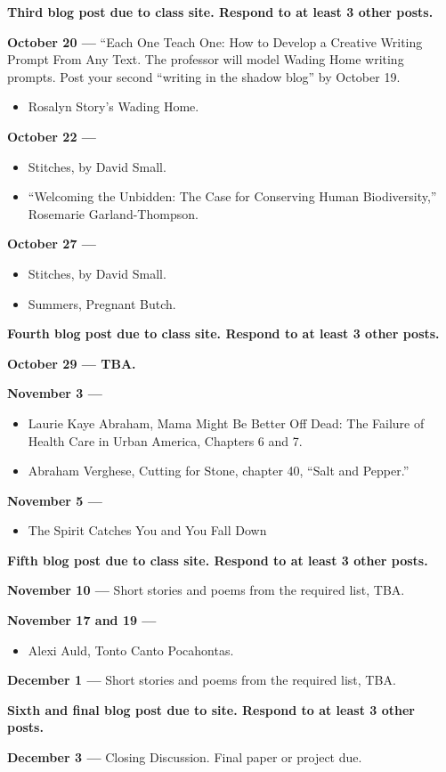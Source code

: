 \documentclass[12pt]{article}
\providecommand{\tightlist}{%
  \setlength{\itemsep}{0pt}\setlength{\parskip}{0pt}}
\begin{document}
\textbf{Third blog post due to class site. Respond to at least 3 other
posts.}

\textbf{October 20 ---} ``Each One Teach One: How to Develop a Creative
Writing Prompt From Any Text. The professor will model Wading Home
writing prompts. Post your second ``writing in the shadow blog'' by
October 19.

\begin{itemize}
\tightlist
\item
  Rosalyn Story's Wading Home.
\end{itemize}

\textbf{October 22 ---}

\begin{itemize}
\tightlist
\item
  Stitches, by David Small.
\item
  ``Welcoming the Unbidden: The Case for Conserving Human
  Biodiversity,'' Rosemarie Garland-Thompson.
\end{itemize}

\textbf{October 27 ---}

\begin{itemize}
\tightlist
\item
  Stitches, by David Small.
\item
  Summers, Pregnant Butch.
\end{itemize}

\textbf{Fourth blog post due to class site. Respond to at least 3 other
posts.}

\textbf{October 29 --- TBA.}

\textbf{November 3 ---}

\begin{itemize}
\tightlist
\item
  Laurie Kaye Abraham, Mama Might Be Better Off Dead: The Failure of
  Health Care in Urban America, Chapters 6 and 7.
\item
  Abraham Verghese, Cutting for Stone, chapter 40, ``Salt and Pepper.''
\end{itemize}

\textbf{November 5 ---}

\begin{itemize}
\tightlist
\item
  The Spirit Catches You and You Fall Down
\end{itemize}

\textbf{Fifth blog post due to class site. Respond to at least 3 other
posts.}

\textbf{November 10 ---} Short stories and poems from the required list,
TBA.

\textbf{November 17 and 19 ---}

\begin{itemize}
\tightlist
\item
  Alexi Auld, Tonto Canto Pocahontas.
\end{itemize}

\textbf{December 1 ---} Short stories and poems from the required list,
TBA.

\textbf{Sixth and final blog post due to site. Respond to at least 3
other posts.}

\textbf{December 3 ---} Closing Discussion. Final paper or project due.
\end{document}
